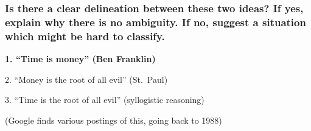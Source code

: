 \documentclass[12pt]{beamer}
\newcommand\gap{\vspace{5mm}}
\begin{document}
\begin{frame} 
\frametitle{ 
Is there a clear delineation between these two ideas? If yes, explain why there is no ambiguity. If no, suggest a situation which might be hard to classify.
}









\end{frame}\begin{frame}
{
\bf
1. ``Time is money'' (Ben Franklin)

2. ``Money is the root of all evil'' (St.\ Paul)

3. ``Time is the root of all evil'' (syllogistic reasoning)
}

\gap

\vspace{5mm}

(Google finds various postings of this, going back to 1988)


\end{frame} \begin{frame}


\end{frame}
\end{document}
